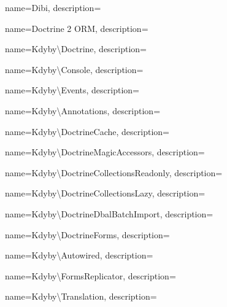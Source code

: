 
 {
  name={Dibi},
  description={} }

 {
  name={Doc\-tri\-ne 2 ORM},
  description={} }

 {
  name={Kdy\-by\textbackslash{}Doc\-tri\-ne},
  description={} }

 {
  name={Kdy\-by\textbackslash{}Con\-so\-le},
  description={} }

 {
  name={Kdy\-by\textbackslash{}E\-ven\-ts},
  description={} }

 {
  name={Kdy\-by\textbackslash{}Anno\-ta\-ti\-on\-s},
  description={} }

 {
  name={Kdy\-by\textbackslash{}Doc\-tri\-ne\-Ca\-che},
  description={} }

 {
  name={Kdy\-by\textbackslash{}Doc\-tri\-ne\-Ma\-gic\-Acces\-sor\-s},
  description={} }

 {
  name={Kdy\-by\textbackslash{}Doc\-tri\-ne\-Collec\-ti\-ons\-Read\-on\-ly},
  description={} }

 {
  name={Kdy\-by\textbackslash{}Doc\-tri\-ne\-Collec\-ti\-ons\-La\-zy},
  description={} }

 {
  name={Kdy\-by\textbackslash{}Doc\-tri\-ne\-Dbal\-Batch\-Im\-port},
  description={} }

 {
  name={Kdy\-by\textbackslash{}Doc\-tri\-ne\-Forms},
  description={} }

 {
  name={Kdy\-by\textbackslash{}Auto\-wi\-red},
  description={} }

 {
  name={Kdy\-by\textbackslash{}Forms\-Re\-pli\-ca\-tor},
  description={} }

 {
  name={Kdy\-by\textbackslash{}Tran\-sla\-tion},
  description={} }

